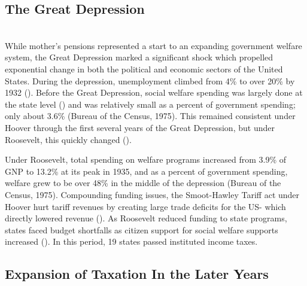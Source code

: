 \documentclass[letter, 12pt]{article}
\begin{document}
\subsection{The Great Depression}\hfill\\

While mother's pensions represented a start to an expanding government welfare system, the Great Depression marked a significant shock which propelled exponential change in both the political and economic sectors of the United States. During the depression, unemployment climbed from 4\% to over 20\% by 1932 (\citealt{steindl2004understanding}). Before the Great Depression, social welfare spending was largely done at the state level (\citealt{amenta1988formative}) and was relatively small as a percent of government spending; only about 3.6\% (Bureau of the Census, 1975). This remained consistent under Hoover through the first several years of the Great Depression, but under Roosevelt, this quickly changed (\citealt{leuchtenburg1932roosevelt}). 

Under Roosevelt, total spending on welfare programs increased from 3.9\% of GNP to 13.2\% at its peak in 1935, and as a percent of government spending, welfare grew to be over 48\% in the middle of the depression (Bureau of the Census, 1975). Compounding funding issues, the Smoot-Hawley Tariff act under Hoover hurt tariff revenues by creating large trade deficits for the US- which directly lowered revenue (\citealt{whaples1995there}). As Roosevelt reduced funding to state programs, states faced budget shortfalls as citizen support for social welfare supports increased (\citealt{kennedy2003american}). In this period, 19 states passed instituted income taxes.

\subsection{Expansion of Taxation In the Later Years}\hfill\\
\end{document}
